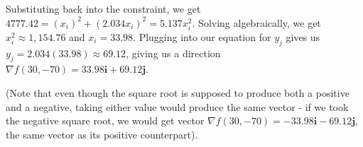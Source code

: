 \documentclass{article}
\begin{document}
\par\noindent\Large Substituting back into the constraint, we get $4777.42 = (x_{i})^{2} + (2.034x_{i})^{2} = 5.137x_{i}^{2}$.  Solving algebraically, we get $x_{i}^{2} \approx 1,154.76$ and $x_{i} = 33.98$.  Plugging into our equation for $y_{j}$ gives us $y_{j} = 2.034(33.98) \approx 69.12$, giving us a direction $\nabla f(30, -70) = 33.98\textbf{i} + 69.12\textbf{j}$.\vspace{0.25cm}

\par\noindent\large (Note that even though the square root is supposed to produce both a positive and a negative, taking either value would produce the same vector - if we took the negative square root, we would get vector $\nabla f(30, -70) = -33.98\textbf{i} - 69.12\textbf{j}$, the same vector as its positive counterpart).
\end{document}
